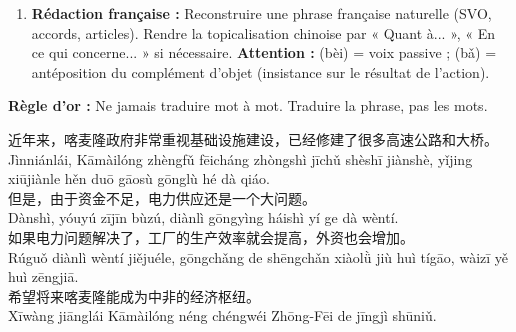 \documentclass[11pt]{article}
\newcommand{\cle}[1]{{\popxbold\color{popdark}#1}}
\newcommand{\zh}[1]{\ifmmode\text{#1}\else{#1}\fi}
\begin{document}
\begin{methode}
\begin{enumerate}
    \item \textbf{Rédaction française :} Reconstruire une phrase française naturelle (SVO, accords, articles). Rendre la \cle{topicalisation} chinoise par « Quant à... », « En ce qui concerne... » si nécessaire. \textbf{Attention :} \zh{被} (bèi) = voix passive ; \zh{把} (bǎ) = antéposition du complément d'objet (insistance sur le résultat de l'action).
\end{enumerate}
\textbf{Règle d'or :} Ne jamais traduire mot à mot. Traduire la \cle{phrase}, pas les \cle{mots}.
\end{methode}

\begin{textebox}
近年来，喀麦隆政府非常重视基础设施建设，已经修建了很多高速公路和大桥。\\
Jìnniánlái, Kāmàilóng zhèngfǔ fēicháng zhòngshì jīchǔ shèshī jiànshè, yǐjing xiūjiànle hěn duō gāosù gōnglù hé dà qiáo.\\
但是，由于资金不足，电力供应还是一个大问题。\\
Dànshì, yóuyú zījīn bùzú, diànlì gōngyìng háishì yí ge dà wèntí.\\
如果电力问题解决了，工厂的生产效率就会提高，外资也会增加。\\
Rúguǒ diànlì wèntí jiějuéle, gōngchǎng de shēngchǎn xiàolǜ jiù huì tígāo, wàizī yě huì zēngjiā.\\
希望将来喀麦隆能成为中非的经济枢纽。\\
Xīwàng jiānglái Kāmàilóng néng chéngwéi Zhōng-Fēi de jīngjì shūniǔ.
\end{textebox}
\end{document}
